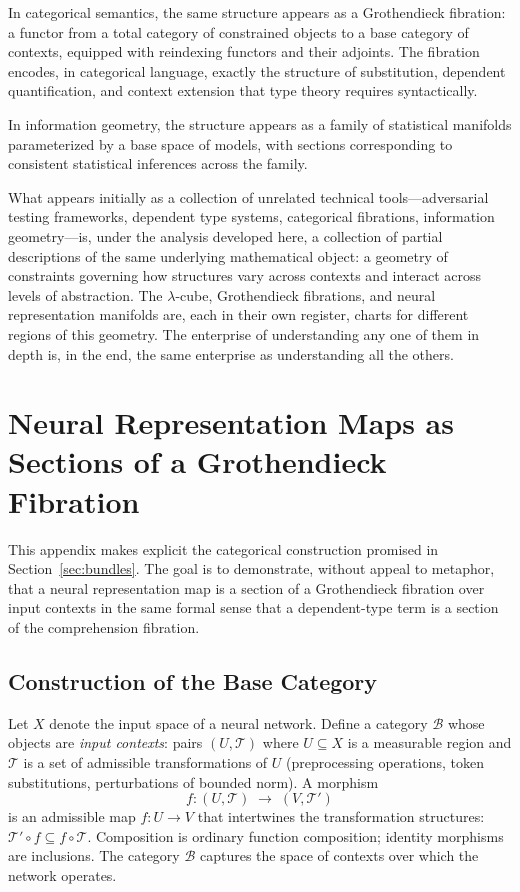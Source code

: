 \documentclass[12pt,a4paper]{article}
\theoremstyle{plain}
\theoremstyle{definition}
\newcommand{\B}{\mathcal{B}}
\begin{document}
In categorical semantics, the same structure appears as a Grothendieck
fibration: a functor from a total category of constrained objects to a base
category of contexts, equipped with reindexing functors and their adjoints. The
fibration encodes, in categorical language, exactly the structure of
substitution, dependent quantification, and context extension that type theory
requires syntactically.

In information geometry, the structure appears as a family of statistical
manifolds parameterized by a base space of models, with sections corresponding
to consistent statistical inferences across the family.

What appears initially as a collection of unrelated technical tools---adversarial
testing frameworks, dependent type systems, categorical fibrations, information
geometry---is, under the analysis developed here, a collection of partial
descriptions of the same underlying mathematical object: a geometry of
constraints governing how structures vary across contexts and interact across
levels of abstraction. The $\lambda$-cube, Grothendieck fibrations, and neural
representation manifolds are, each in their own register, charts for different
regions of this geometry. The enterprise of understanding any one of them in
depth is, in the end, the same enterprise as understanding all the others.

\appendix
\section{Neural Representation Maps as Sections of a Grothendieck Fibration}

This appendix makes explicit the categorical construction promised in
Section~\ref{sec:bundles}. The goal is to demonstrate, without appeal to
metaphor, that a neural representation map is a section of a Grothendieck
fibration over input contexts in the same formal sense that a dependent-type
term is a section of the comprehension fibration.

\subsection*{Construction of the Base Category}

Let $X$ denote the input space of a neural network. Define a category $\B$
whose objects are \emph{input contexts}: pairs $(U, \mathcal{T})$ where $U
\subseteq X$ is a measurable region and $\mathcal{T}$ is a set of admissible
transformations of $U$ (preprocessing operations, token substitutions,
perturbations of bounded norm). A morphism
\[
f : (U, \mathcal{T}) \;\longrightarrow\; (V, \mathcal{T}')
\]
is an admissible map $f : U \to V$ that intertwines the transformation
structures: $\mathcal{T}' \circ f \subseteq f \circ \mathcal{T}$. Composition
is ordinary function composition; identity morphisms are inclusions. The
category $\B$ captures the space of contexts over which the network operates.
\end{document}

